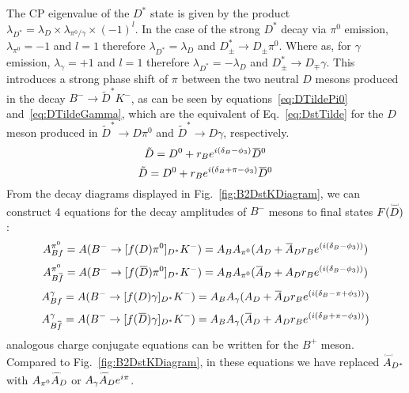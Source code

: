 \documentclass[oneside,12pt]{article}
\newcommand{\overbar}[1]{\mkern 1.5mu\overline{\mkern-1.5mu#1\mkern-1.5mu}\mkern 1.5mu}
\newcommand\brobor{\smash[b]{\raisebox{0.6\height}{\scalebox{0.5}{\tiny(}}{\mkern-1.5mu\scriptstyle-\mkern-1.5mu}\raisebox{0.6\height}{\scalebox{0.5}{\tiny)}}}}
\begin{document}
The CP eigenvalue of the $D^*$ state is given by the product
$\lambda_{D^*}=\lambda_D\times \lambda_{\pi^0\text{/}\gamma} \times(-1)^l$. In
the case of the strong $D^*$ decay via $\pi^0$ emission, $\lambda_{\pi^0}=-1$
and $l=1$ therefore $\lambda_{D^*}=\lambda_D$ and $D^*_{\pm}\rightarrow
D_{\pm}\pi^0$. Where as, for $\gamma$ emission, $\lambda_{\gamma}=+1$ and $l=1$
therefore $\lambda_{D^*}=-\lambda_D$ and $D^*_{\pm}\rightarrow D_{\mp}\gamma$.
This introduces a strong phase shift of $\pi$ between the two neutral $D$ mesons
produced in the decay $B^-\rightarrow \tilde{D}^*K^-$, as can be seen by
equations~\eqref{eq:DTildePi0} and~\eqref{eq:DTildeGamma}, which are the
equivalent of Eq.~\eqref{eq:DstTilde} for the $D$ meson produced in
$\tilde{D}^*\rightarrow D\pi^0$ and $\tilde{D}^*\rightarrow D\gamma$,
respectively.
  \begin{equation}
    \tilde{D}=D^0+r_Be^{i(\delta_B-\phi_3)}\overbar{D}^0
    \label{eq:DTildePi0}
  \end{equation}
  \begin{equation}
    \tilde{D}=D^0+r_Be^{i(\delta_B+\pi-\phi_3)}\overbar{D}^0
    \label{eq:DTildeGamma}
  \end{equation}
\noindent From the decay diagrams displayed in Fig.~\ref{fig:B2DstKDiagram}, we
can construct 4 equations for the decay amplitudes of $B^{-}$ mesons to final
states $F(\accentset{\brobor}{D}\phantom{})$:
  \begin{equation}
    A_{Bf}^{\pi^{0}}=A(B^{-}\rightarrow [f(D)\pi^{0}]_{D^{*}}K^{-})=A_{B}A_{\pi^{0}}(A_{D}+\overbar{A}_{D}r_{B}e^{(i(\delta_{B}-\phi_{3}))})
    \label{eq:A(Bf)pi0}
  \end{equation}
  \begin{equation}
    A_{B\overbar{f}}^{\pi^{0}}=A(B^{-}\rightarrow [f(\overbar{D})\pi^{0}]_{D^{*}}K^{-})=A_{B}A_{\pi^{0}}(\overbar{A}_{D}+A_{D}r_{B}e^{(i(\delta_{B}-\phi_{3}))})
    \label{eq:A(Bfbar)pi0}
  \end{equation}
  \begin{equation}
    A_{Bf}^{\gamma}=A(B^{-}\rightarrow [f(D)\gamma]_{D^{*}}K^{-})=A_{B}A_{\gamma}(A_{D}+\overbar{A}_{D}r_{B}e^{(i(\delta_{B}-\pi+\phi_{3}))})
    \label{eq:A(Bf)gamma}
  \end{equation}
  \begin{equation}
    A_{B\overbar{f}}^{\gamma}=A(B^{-}\rightarrow [f(\overbar{D})\gamma]_{D^{*}}K^{-})=A_{B}A_{\gamma}(\overbar{A}_{D}+A_{D}r_{B}e^{(i(\delta_{B}+\pi-\phi_{3}))})
    \label{eq:A(Bfbar)gamma}
  \end{equation}
 analogous charge conjugate equations can be written for the $B^{+}$
meson. Compared to Fig.~\ref{fig:B2DstKDiagram}, in these equations we have
replaced $\accentset{\brobor}{A}\phantom{}_{D^{*}}$ with
$A_{\pi^{0}}\accentset{\brobor}{A}\phantom{}_{D}$ or
$A_{\gamma}\accentset{\brobor}{A}\phantom{}_{D}e^{{i\pi}}$. 
\end{document}
